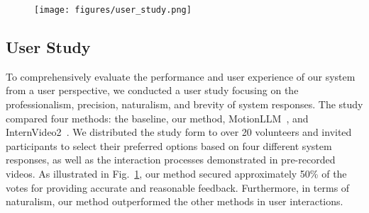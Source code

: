 \begin{figure}[t!]
  \centering
  \texttt{[image: figures/user\_study.png]}
  \captionof{figure}{\textbf{User study.} 
  A comparison of subjective preferences for textual feedback across four dimensions: Professionalism, Precision, Naturalism, and Brevity. Participants were asked to evaluate the textual feedback generated by four different methods (Baseline, InternVideo2, MotionLLM and Ours). Our approach achieved the highest ratings in all categories, demonstrating superior performance across all evaluated aspects.}
\label{fig:user_study}
\end{figure}

\subsection{User Study}

To comprehensively evaluate the performance and user experience of our system from a user perspective, we conducted a user study focusing on the professionalism, precision, naturalism, and brevity of system responses. The study compared four methods: the baseline, our method, MotionLLM~\cite{chen2024motionllm}, and InternVideo2~\cite{chen2024internvl2}. We distributed the study form to over 20 volunteers and invited participants to select their preferred options based on four different system responses, as well as the interaction processes demonstrated in pre-recorded videos. As illustrated in Fig.~\ref{fig:user_study}, our method secured approximately 50\% of the votes for providing accurate and reasonable feedback. Furthermore, in terms of naturalism, our method outperformed the other methods in user interactions.